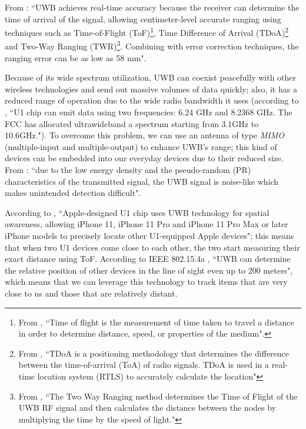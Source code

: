 \documentclass[english]{article}
\begin{document}
From \cite{Coppens2022}: ``UWB achieves real-time accuracy because the receiver can determine the time of arrival of the signal, allowing centimeter-level accurate ranging using techniques such as Time-of-Flight (ToF)\footnote{From \cite{tof}, ``Time of flight is the measurement of time taken to travel a distance in order to determine distance, speed, or properties of the medium".}, Time Difference of Arrival (TDoA)\footnote{From \cite{tdoa}, ``TDoA is a positioning methodology that determines the difference between the time-of-arrival (ToA) of radio signals. TDoA is used in a real-time location system (RTLS) to accurately calculate the location"} and Two-Way Ranging (TWR)\footnote{From \cite{twr}, ``The Two Way Ranging method determines the Time of Flight of the UWB RF signal and then calculates the distance between the nodes by multiplying the time by the speed of light."}. Combining with error correction techniques, the ranging error can be as low as 58 mm".

Because of its wide spectrum utilization, UWB can coexist peacefully with other wireless technologies and send out massive volumes of data quickly; also, it has a reduced range of operation due to the wide radio bandwidth it uses (according to \cite{Zafar2019}, ``U1 chip can emit data using two frequencies: 6.24 GHz and 8.2368 GHz. The FCC has allocated ultrawideband a spectrum starting from 3.1GHz to 10.6GHz."). To overcome this problem, we can use an antenna of type \textit{MIMO} (multiple-input and multiple-output) to enhance UWB's range; this kind of devices can be embedded into our everyday devices due to their reduced size. From \cite{di2006uwb}: ``due to the low energy density and the pseudo-random (PR) characteristics of the transmitted signal, the UWB signal is noise-like which makes unintended detection difficult".

According to \cite{aps}, ``Apple-designed U1 chip uses UWB technology for spatial awareness, allowing iPhone 11, iPhone 11 Pro and iPhone 11 Pro Max or later iPhone models to precisely locate other U1-equipped Apple devices"; this means that when two U1 devices come close to each other, the two start measuring their exact distance using ToF. According to IEEE 802.15.4a \cite{5394030}, ``UWB can determine the relative position of other devices in the line of sight even up to 200 meters", which means that we can leverage this technology to track items that are very close to us and those that are relatively distant.
\end{document}
